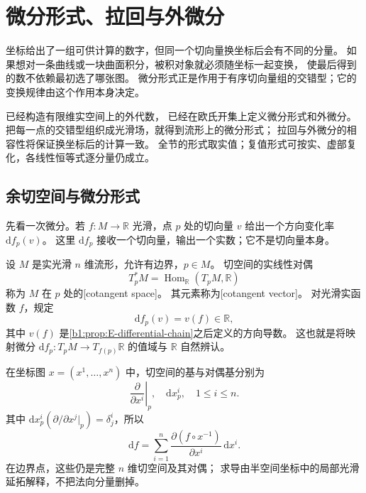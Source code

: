 \section{微分形式、拉回与外微分}
\label{b1:sec:E103}

坐标给出了一组可供计算的数字，但同一个切向量换坐标后会有不同的分量。
如果想对一条曲线或一块曲面积分，被积对象就必须随坐标一起变换，
使最后得到的数不依赖最初选了哪张图。
微分形式正是作用于有序切向量组的交错型；它的变换规律由这个作用本身决定。

\ProseParagraphBreak

已经构造有限维实空间上的外代数，
已经在欧氏开集上定义微分形式和外微分。
把每一点的交错型组织成光滑场，就得到流形上的微分形式；
拉回与外微分的相容性将保证换坐标后的计算一致。
全节的形式取实值；复值形式可按实、虚部复化，各线性恒等式逐分量仍成立。

\subsection{余切空间与微分形式}
\label{b1:subsec:E10301}

先看一次微分。若 \(f:M\to\mathbb R\) 光滑，点 \(p\) 处的切向量 \(v\)
给出一个方向变化率 \(\mathrm df_p(v)\)。
这里 \(\mathrm df_p\) 接收一个切向量，输出一个实数；它不是切向量本身。

\begin{definition}\label{b1:def:E-cotangent}
设 \(M\) 是实光滑 \(n\) 维流形，允许有边界，\(p\in M\)。
切空间的实线性对偶
\[
 T_p^*M=\operatorname{Hom}_{\mathbb R}(T_pM,\mathbb R)
\]
称为 \(M\) 在 \(p\) 处的[cotangent space]。
其元素称为[cotangent vector]。
对光滑实函数 \(f\)，规定
\[
 \mathrm df_p(v)=v(f)\in\mathbb R,
\]
其中 \(v(f)\) 是\cref{b1:prop:E-differential-chain}之后定义的方向导数。
这也就是将映射微分 \(\mathrm d f_p:T_pM\to T_{f(p)}\mathbb R\)
的值域与 \(\mathbb R\) 自然辨认。
\end{definition}

在坐标图 \(x=(x^1,\ldots,x^n)\) 中，切空间的基与对偶基分别为
\[
 \left.\frac{\partial}{\partial x^i}\right|_p,\quad
 \mathrm dx^i_p,\quad 1\leq i\leq n.
\]
其中 \(\mathrm dx^i_p(\partial/\partial x^j|_p)=\delta^i_j\)，所以
\[
 \mathrm df=\sum_{i=1}^n
 \frac{\partial(f\circ x^{-1})}{\partial x^i}\,\mathrm dx^i.
\]
在边界点，这些仍是完整 \(n\) 维切空间及其对偶；
求导由半空间坐标中的局部光滑延拓解释，不把法向分量删掉。

